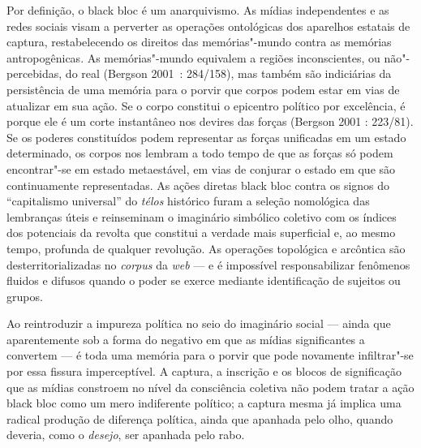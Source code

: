 Por definição, o black bloc é um anarquivismo. As mídias independentes e
as redes sociais visam a perverter as operações ontológicas dos
aparelhos estatais de captura, restabelecendo os direitos das
memórias"-mundo contra as memórias antropogênicas. As memórias"-mundo
equivalem a regiões inconscientes, ou não"-percebidas, do real (Bergson
2001~: 284/158), mas também são indiciárias da persistência de uma
memória para o porvir que corpos podem estar em vias de atualizar em sua
ação. Se o corpo constitui o epicentro político por excelência, é porque
ele é um corte instantâneo nos devires das forças (Bergson 2001 :
223/81). Se os poderes constituídos podem representar as forças
unificadas em um estado determinado, os corpos nos lembram a todo tempo
de que as forças só podem encontrar"-se em estado metaestável, em vias de
conjurar o estado em que são continuamente representadas. As ações
diretas black bloc contra os signos do ``capitalismo universal'' do
\emph{télos }histórico furam a seleção nomológica das lembranças úteis e
reinseminam o imaginário simbólico coletivo com os índices dos
potenciais da revolta que constitui a verdade mais superficial e, ao
mesmo tempo, profunda de qualquer revolução. As operações topológica e
arcôntica são desterritorializadas no \emph{corpus} da \emph{web} --- e é
impossível responsabilizar fenômenos fluidos e difusos quando o poder se
exerce mediante identificação de sujeitos ou grupos.

Ao reintroduzir a impureza política no seio do imaginário social ---
ainda que aparentemente sob a forma do negativo em que as mídias
significantes a convertem --- é toda uma memória para o porvir que pode
novamente infiltrar"-se por essa fissura imperceptível. A captura, a
inscrição e os blocos de significação que as mídias constroem no nível
da consciência coletiva não podem tratar a ação black bloc como um mero
indiferente político; a captura mesma já implica uma radical produção de
diferença política, ainda que apanhada pelo olho, quando deveria, como o
\emph{desejo}, ser apanhada pelo rabo.

